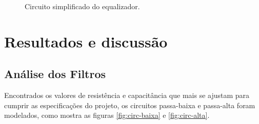 \documentclass{article}
\begin{document}
\begin{figure}[h!]
  \centering
  
  \caption{Circuito simplificado do equalizador.}
  \label{fig:equalizador}
\end{figure}

\pagebreak

\section{Resultados e discussão}
\subsection{Análise dos Filtros}

Encontrados os valores de resistência e capacitância que mais se ajustam para cumprir as especificações do projeto, os circuitos passa-baixa e passa-alta foram modelados, como mostra as figuras \ref{fig:circ-baixa} e \ref{fig:circ-alta}.
\end{document}

